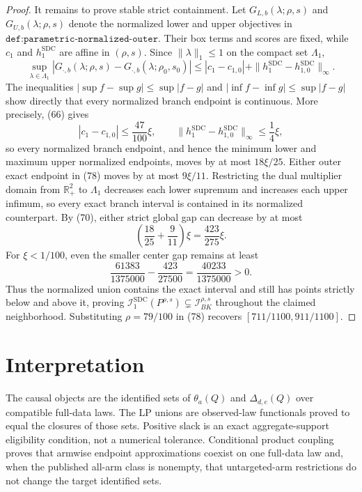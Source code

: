 \documentclass{article}
\begin{document}
\begin{proof}
It remains to prove stable strict containment.  Let \(G_{L,b}(\lambda;\rho,s)\) and \(G_{U,b}(\lambda;\rho,s)\) denote the normalized lower and upper objectives in \(\texttt{def:parametric-normalized-outer}\).  Their box terms and scores are fixed, while \(c_1\) and \(h_1^{\mathrm{SDC}}\) are affine in \((\rho,s)\).  Since \(\|\lambda\|_1\le1\) on the compact set \(\Lambda_1\),
\[
 \sup_{\lambda\in\Lambda_1}
 |G_{\cdot,b}(\lambda;\rho,s)-G_{\cdot,b}(\lambda;\rho_0,s_0)|
 \le |c_1-c_{1,0}|+\|h_1^{\mathrm{SDC}}-h_{1,0}^{\mathrm{SDC}}\|_\infty.    \tag{79}
\]
The inequalities \(|\sup f-\sup g|\le\sup|f-g|\) and \(|\inf f-\inf g|\le\sup|f-g|\) show directly that every normalized branch endpoint is continuous.  More precisely, (66) gives
\[
 |c_1-c_{1,0}|\le\frac{47}{100}\xi,
 \qquad
 \|h_1^{\mathrm{SDC}}-h_{1,0}^{\mathrm{SDC}}\|_\infty\le\frac14\xi,         \tag{80}
\]
so every normalized branch endpoint, and hence the minimum lower and maximum upper normalized endpoints, moves by at most \(18\xi/25\).  Either outer exact endpoint in (78) moves by at most \(9\xi/11\).  Restricting the dual multiplier domain from \(\mathbb R_+^2\) to \(\Lambda_1\) decreases each lower supremum and increases each upper infimum, so every exact branch interval is contained in its normalized counterpart.  By (70), either strict global gap can decrease by at most
\[
 \left(\frac{18}{25}+\frac9{11}\right)\xi=\frac{423}{275}\xi.               \tag{81}
\]
For \(\xi<1/100\), even the smaller center gap remains at least
\[
 \frac{61383}{1375000}-\frac{423}{27500}
 =\frac{40233}{1375000}>0.                                                    \tag{82}
\]
Thus the normalized union contains the exact interval and still has points strictly below and above it, proving
\(\mathcal I_1^{\mathrm{SDC}}(P^{\rho,s})\subsetneq\mathcal I_{BK}^{\rho,s}\) throughout the claimed neighborhood.  Substituting \(\rho=79/100\) in (78) recovers \([711/1100,911/1100]\).
\end{proof}

\section{Interpretation}

The causal objects are the identified sets of \(\theta_a(Q)\) and \(\Delta_{d,e}(Q)\) over compatible full-data laws. The LP unions are observed-law functionals proved to equal the closures of those sets. Positive slack is an exact aggregate-support eligibility condition, not a numerical tolerance. Conditional product coupling proves that armwise endpoint approximations coexist on one full-data law and, when the published all-arm class is nonempty, that untargeted-arm restrictions do not change the target identified sets.
\end{document}
